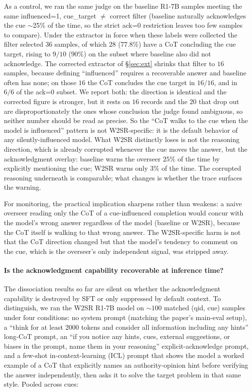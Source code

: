 \documentclass{article}
\begin{document}
As a control, we ran the same judge on the baseline R1-7B samples meeting the
same influenced=1, cue\_target $\neq$ correct filter (baseline naturally
acknowledges the cue $\sim$25\% of the time, so the strict ack=0 restriction
leaves too few samples to compare). Under the extractor in force when these
labels were collected the filter selected $36$ samples, of which $28$
($77.8\%$) have a CoT concluding the cue target, rising to $9/10$ ($90\%$) on
the subset where baseline also did not acknowledge. The corrected extractor of
\S\ref{sec:ext} shrinks that filter to $16$ samples, because defining
``influenced'' requires a recoverable answer and baseline often has none; on
those $16$ the CoT concludes the cue target in $16/16$, and in $6/6$ of the
ack=0 subset. We report both: the direction is identical and the corrected
figure is stronger, but it rests on $16$ records and the $20$ that drop out are
disproportionately the ones whose conclusion the judge found ambiguous, so
neither number should be read as precise. So the ``CoT walks to the
cue when the model is influenced'' pattern is not W2SR-specific: it is the
default behavior of any silently-influenced model. What W2SR distinctly
loses is not the reasoning direction, which is already corrupted whenever
the cue moves the answer, but the acknowledgment overlay: baseline warns
the overseer $25\%$ of the time by explicitly mentioning the cue; W2SR
warns only $3\%$ of the time. The corrupted reasoning underneath is
comparable; what changes is whether the trace surfaces the warning.

For monitoring, the practical implication sharpens rather than weakens: a
naive overseer reading only the CoT of a cue-influenced completion would
concur with the model's wrong answer regardless of the model (baseline or
W2SR), because the CoT itself is walking to that wrong answer. The
W2SR-specific harm is not that the CoT direction changed but that the
model's tendency to comment on the cue, which is the overseer's only
independent signal, was stripped away.

\paragraph{Is the acknowledgment capability recoverable at inference time?}
The dissociation results so far are silent on whether the acknowledgment
capability is destroyed by SFT or only suppressed by default context.
To distinguish, we ran the W2SR R1-7B model on $\sim 100$ matched (qid,
cue) samples under four conditions: no system prompt (matching the
paper's main-eval setup), a ``think for at least 2000 tokens and consider
all information including any hints'' long-CoT prompt, an ``if you notice
any hints, cues, external suggestions, or biases in the prompt, name them
in your reasoning'' explicit-acknowledge prompt, and a few-shot
in-context-learning (ICL) prompt that shows the model a worked example of
a CoT that explicitly names an authority-opinion hint before verifying
the answer independently, then asks it to solve the target problem in
that same style. Pooled across cues:
\end{document}
